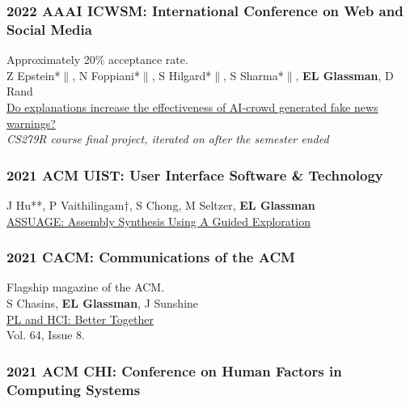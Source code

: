 \documentclass[10pt, a4paper]{article}
\newcommand{\years}[1]{\marginnote{\normalsize #1}}
\begin{document}
\subsubsection*{2022 AAAI \textbf{ICWSM}: International Conference on Web and Social Media}
Approximately 20\% acceptance rate.\\

\years{\textbf{C22}}Z Epstein*$\|$, N Foppiani*$\|$, S Hilgard*$\|$, S Sharma*$\|$, \textbf{EL Glassman}, D Rand\\
\href{http://glassmanlab.seas.harvard.edu/papers/epsteinEtAl_CS279_icwsm.pdf}{Do explanations increase the effectiveness of AI-crowd generated fake news warnings?}\\
\textit{CS279R course final project, iterated on after the semester ended}

\subsubsection*{2021 ACM \textbf{UIST}: User Interface Software \& Technology}

\years{\textbf{C21}}J Hu**, P Vaithilingam$\dagger$, S Chong, M Seltzer, \textbf{EL Glassman}\\
\href{http://glassmanlab.seas.harvard.edu/papers/ASSUAGE_UIST21.pdf}{ASSUAGE: Assembly Synthesis Using A Guided Exploration}

\subsubsection*{2021 \textbf{CACM}: Communications of the ACM}
Flagship magazine of the ACM.\\%

\years{\textbf{M1}}S Chasins, \textbf{EL Glassman}, J Sunshine\\
\href{http://glassmanlab.seas.harvard.edu/papers/PLandHCI_betterTogether.pdf}{PL and HCI: Better Together}\\
Vol. 64, Issue 8.

\subsubsection*{2021 ACM \textbf{CHI}: Conference on Human Factors in Computing Systems}
\end{document}
